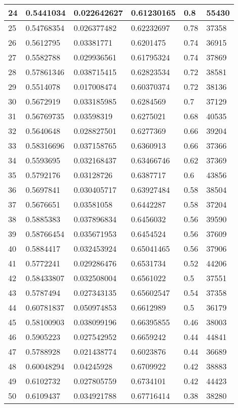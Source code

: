 \begin{longtable}{|l|l|l|l|l|l|}
24 & 0.5441034 & 0.022642627 & 0.61230165 & 0.8 & 55430 \\ \hline 
25 & 0.54768354 & 0.026377482 & 0.62232697 & 0.78 & 37358 \\ \hline 
26 & 0.5612795 & 0.03381771 & 0.6201475 & 0.74 & 36915 \\ \hline 
27 & 0.5582788 & 0.029936561 & 0.61795324 & 0.74 & 37869 \\ \hline 
28 & 0.57861346 & 0.038715415 & 0.62823534 & 0.72 & 38581 \\ \hline 
29 & 0.5514078 & 0.017008474 & 0.60370374 & 0.72 & 38136 \\ \hline 
30 & 0.5672919 & 0.033185985 & 0.6284569 & 0.7 & 37129 \\ \hline 
31 & 0.56769735 & 0.03598319 & 0.6275021 & 0.68 & 40535 \\ \hline 
32 & 0.5640648 & 0.028827501 & 0.6277369 & 0.66 & 39204 \\ \hline 
33 & 0.58316696 & 0.037158765 & 0.6360913 & 0.66 & 37366 \\ \hline 
34 & 0.5593695 & 0.032168437 & 0.63466746 & 0.62 & 37369 \\ \hline 
35 & 0.5792176 & 0.03128726 & 0.6387717 & 0.6 & 43856 \\ \hline 
36 & 0.5697841 & 0.030405717 & 0.63927484 & 0.58 & 38504 \\ \hline 
37 & 0.5676651 & 0.03581058 & 0.6442287 & 0.58 & 37204 \\ \hline 
38 & 0.5885383 & 0.037896834 & 0.6456032 & 0.56 & 39590 \\ \hline 
39 & 0.58766454 & 0.035671953 & 0.6454524 & 0.56 & 37609 \\ \hline 
40 & 0.5884417 & 0.032453924 & 0.65041465 & 0.56 & 37906 \\ \hline 
41 & 0.5772241 & 0.029286476 & 0.6531734 & 0.52 & 44206 \\ \hline 
42 & 0.58433807 & 0.032508004 & 0.6561022 & 0.5 & 37551 \\ \hline 
43 & 0.5787494 & 0.027343135 & 0.65602547 & 0.54 & 37358 \\ \hline 
44 & 0.60781837 & 0.050974853 & 0.6612989 & 0.5 & 36179 \\ \hline 
45 & 0.58100903 & 0.038099196 & 0.66395855 & 0.46 & 38003 \\ \hline 
46 & 0.5905223 & 0.027542952 & 0.6659242 & 0.44 & 44841 \\ \hline 
47 & 0.5788928 & 0.021438774 & 0.6023876 & 0.44 & 36689 \\ \hline 
48 & 0.60048294 & 0.04245928 & 0.6709922 & 0.42 & 38883 \\ \hline 
49 & 0.6102732 & 0.027805759 & 0.6734101 & 0.42 & 44423 \\ \hline 
50 & 0.6109437 & 0.034921788 & 0.67716414 & 0.38 & 38280 \\ \hline 
\end{longtable}